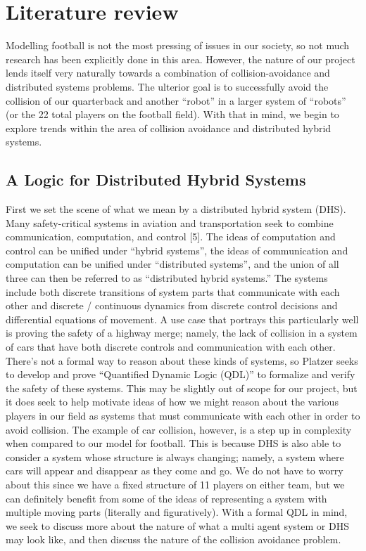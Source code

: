 
\section{Literature review}

\quad Modelling football is not the most pressing of issues in our society, so not much research has been explicitly done in this area. However, the nature of our project lends itself very naturally towards a combination of collision-avoidance and distributed systems problems. The ulterior goal is to successfully avoid the collision of our quarterback and another “robot” in a larger system of “robots” (or the 22 total players on the football field). With that in mind, we begin to explore trends within the area of collision avoidance and distributed hybrid systems. 

\subsection{A Logic for Distributed Hybrid Systems}
\quad First we set the scene of what we mean by a distributed hybrid system (DHS). Many safety-critical systems in aviation and transportation seek to combine communication, computation, and control [5]. The ideas of computation and control can be unified under “hybrid systems”, the ideas of communication and computation can be unified under “distributed systems”, and the union of all three can then be referred to as “distributed hybrid systems.” The systems include both discrete transitions of system parts that communicate with each other and discrete / continuous dynamics from discrete control decisions and differential equations of movement. A use case that portrays this particularly well is proving the safety of a highway merge; namely, the lack of collision in a system of cars that have both discrete controls and communication with each other. There’s not a formal way to reason about these kinds of systems, so Platzer seeks to develop and prove “Quantified Dynamic Logic (QDL)” to formalize and verify the safety of these systems. This may be slightly out of scope for our project, but it does seek to help motivate ideas of how we might reason about the various players in our field as systems that must communicate with each other in order to avoid collision. The example of car collision, however, is a step up in complexity when compared to our model for football. This is because DHS is also able to consider a system whose structure is always changing; namely, a system where cars will appear and disappear as they come and go. We do not have to worry about this since we have a fixed structure of 11 players on either team, but we can definitely benefit from some of the ideas of representing a system with multiple moving parts (literally and figuratively). With a formal QDL in mind, we seek to discuss more about the nature of what a multi agent system or DHS may look like, and then discuss the nature of the collision avoidance problem. 

